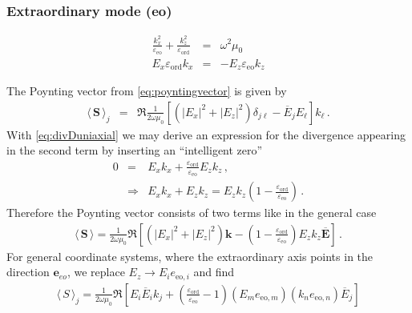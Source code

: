\documentclass[12pt,a4paper,twoside,openright,BCOR10mm,headsepline,titlepage,abstracton,chapterprefix,final]{scrreprt}
\newcommand\Vector[1]{{\mathbf{#1}}}
\newcommand\vacuum{0}
\newcommand\wavenumber{k}
\newcommand\Wavevector{\Vector{\wavenumber}}
\newcommand\scalarEfield{E}
\newcommand\Efield{\Vector{\scalarEfield}}
\newcommand\vacuumpermeability{\scalarpermeability_{\vacuum}}
\newcommand\scalarpermeability{\mu}
\newcommand\scalarpermittivity{\varepsilon}
\newcommand\ordi{\text{ord}}
\newcommand\eo{\text{eo}}
\newcommand{\timeavg}[1]{{\langle\,#1\,\rangle}}
\begin{document}
\subsubsection{Extraordinary mode (eo)}
\begin{eqnarray}
  \frac{\wavenumber_{x}^2 }{\scalarpermittivity_{\eo} } + \frac{\wavenumber_{z}^2 }{\scalarpermittivity_{\ordi} } &=& \omega^2 \vacuumpermeability 
  \label{eq:uniaxialAnisotropicDispersion}
  \\
  \scalarEfield_x \scalarpermittivity_{\ordi} \wavenumber_x &=& -  \scalarEfield_z \scalarpermittivity_{\eo} \wavenumber_z \label{eq:divDuniaxial}
\end{eqnarray}

The Poynting vector from \eqref{eq:poyntingvector} is given by
\begin{eqnarray}
 \timeavg{\Vector{S}}_j &=&  \Re\frac{1}{2 \omega \vacuumpermeability}\left[ (|\scalarEfield_x|^2 + |\scalarEfield_z|^2) \delta_{j\ell}  - \overline{\scalarEfield}_j \scalarEfield_\ell \right] k_\ell\,.
\end{eqnarray}
With \eqref{eq:divDuniaxial} we may derive an expression for the divergence appearing in the second term by inserting an ``intelligent zero''
\begin{eqnarray}
 0 &=& \scalarEfield_x \wavenumber_x + \frac{\scalarpermittivity_{\ordi}}{\scalarpermittivity_\eo} \scalarEfield_z \wavenumber_z\,,\nonumber\\
&\Rightarrow& \scalarEfield_x \wavenumber_x + \scalarEfield_z \wavenumber_z = \scalarEfield_z \wavenumber_z \left(1 - \frac{\scalarpermittivity_{\ordi}}{\scalarpermittivity_\eo}\right)\,. \label{eq:divEviolation}
\end{eqnarray}
Therefore the Poynting vector consists of two terms like in the general case
\begin{eqnarray}
  \timeavg{\Vector{S}} = \frac{ 1 }{ 2\omega\vacuumpermeability } \Re 
  \left[
      (|\scalarEfield_x|^2 + |\scalarEfield_z|^2)\Wavevector
      - \left(1 - \frac{\scalarpermittivity_{\ordi}}{\scalarpermittivity_\eo}\right)\scalarEfield_z \wavenumber_z \overline{\Efield}
  \right]\,.\label{eq:Suniaxialeo}
\end{eqnarray}
For general coordinate systems, where the extraordinary axis points in the direction $\Vector{e}_{eo}$, 
we replace $E_z \rightarrow E_i e_{\eo, i}$ and find
\begin{eqnarray}
  \timeavg{S}_j = \frac{ 1 }{ 2\omega\vacuumpermeability } \Re 
  \left[
      \scalarEfield_i \overline{\scalarEfield}_i \wavenumber_j
      + \left(\frac{\scalarpermittivity_{\ordi}}{\scalarpermittivity_\eo} - 1\right)
        (\scalarEfield_m e_{\eo,m}) (\wavenumber_n e_{\eo,n}) \overline{\scalarEfield}_j
  \right]
\end{eqnarray}
\end{document}

